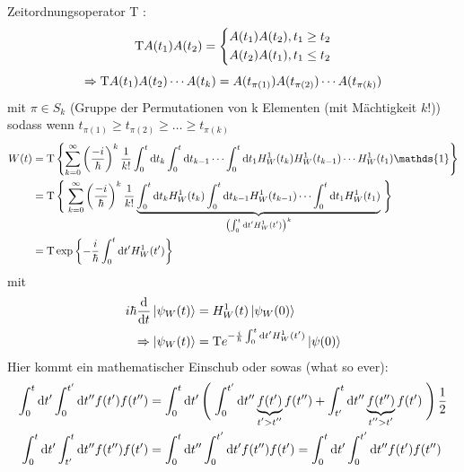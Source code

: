 	Zeitordnungsoperator T : 
		\begin{align*}
		\mathrm{T} A(t_1) A(t_2) = 
		\left\{
			\begin{aligned}
				A(t_1) A(t_2) &, t_1 \geq t_2 \\
				A(t_2) A(t_1) &, t_1 \leq t_2 
			\end{aligned}
		\right.
		\end{align*}
		\begin{equation*}
			\Rightarrow \mathrm{T} A(t_1) A(t_2) \cdots A(t_k) = A(t_{\pi(1)}) A(t_{\pi(2)}) \cdots A(t_{\pi(k)})
		\end{equation*}
	mit $\pi \in S_k$ (Gruppe der Permutationen von k Elementen (mit Mächtigkeit $k!$))
	sodass wenn $t_{\pi(1)} \geq t_{\pi(2)} \geq \ldots \geq t_{\pi(k)}$
		\begin{align*}
			W(t) &= \T 
			\left\{
				\sum_{k=0}^\infty \left( \frac{-i}{\hbar}\right)^k \frac{1}{k!} 
				\int_{0}^{t} \diff t_k \int_{0}^{t} \diff t_{k-1} \cdots
				\int_{0}^{t} \diff t_1 
				H_W^1(t_k) H_W^1(t_{k-1}) \cdots H_W^1(t_1) \mathds{1} 
			\right\} \\
			&= \T
			\left\{\vphantom{\sum_{k=0}^{\infty}} \right.
				\sum_{k=0}^{\infty} 
				\left( \frac{-i}{\hbar}\right)^k \frac{1}{k!}
				\underbrace{
					\int_{0}^{t} \diff t_k H_W^1(t_k) 
					\int_{0}^{t} \diff t_{k-1} H_W^1(t_{k-1}) \cdots
					\int_{0}^{t} \diff t_1 H_W^1(t_1)
				}_{\mathclap{\left( \int_{0}^{t} \diff t' H_W^1(t') \right)^k }}
			\left. \vphantom{\sum_{k=0}^{\infty}}\right\} \\
			&= \T \exp 
			\left\{
				- \frac{i}{\hbar} \int_{0}^{t} \diff t' H_W^1(t')
			\right\}
		\end{align*}
	mit
		\begin{align*}
			i\hbar \frac{\mathrm{d}}{\mathrm{d} t} \ket{\psi_W(t)} &= H_W^1(t) \ket{\psi_W(0)} \\
			\Rightarrow 
			\ket{\psi_W(t)} &= \mathrm{T} e^{-\frac{i}{\hbar} \int_{0}^{t} \mathrm{d} t' H_W^1(t')} \ket{\psi(0)}
		\end{align*}
	Hier kommt ein mathematischer Einschub oder sowas (what so ever):
		\begin{align*}
			\int_{0}^{t} \diff t' \int_{0}^{t'} \diff t'' f(t') f(t'') 
			&= \int_{0}^{t} \diff t' 
			\left( \vphantom{\int_{0}^{t'} \diff t''} \right.
				\int_{0}^{t'} \diff t'' \underbrace{f(t')}_{\mathclap{t' > t''}} f(t'') 
				+ \int_{t'}^{t} \diff t'' \underbrace{f(t'')}_{\mathclap{t'' > t'}} f(t')
				\left. \vphantom{\int_{0}^{t'} \diff t''} 
			\right) 
			\frac{1}{2} \\
			\int_{0}^{t} \diff t' \int_{t'}^{t} \diff t'' f(t'') f(t') 
			&= \int_{0}^{t} \diff t'' \int_{0}^{t'} \diff t' f(t'') f(t') = \int_{0}^{t} \diff t' \int_{0}^{t'} \diff t'' f(t') f(t'') 
		\end{align*}	
